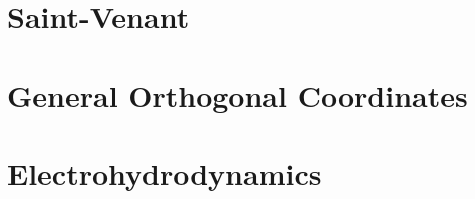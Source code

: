 \documentclass[a4paper]{article}
\begin{document}






\section{Saint-Venant}




\section{General Orthogonal Coordinates}













\section{Electrohydrodynamics}











\end{document}
